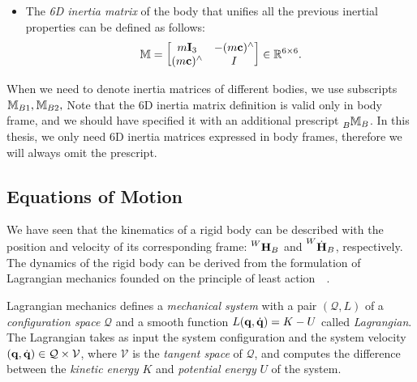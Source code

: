 \begin{itemize}
\item
The \emph{6D inertia matrix} of the body that unifies all the previous inertial properties can be defined as follows:
%
\begin{equation*}
   \masssix =
   \begin{bmatrix}
       m \eye_3 & -(m\mathbf{c})^\wedge \\
       (m\mathbf{c})^\wedge & I
   \end{bmatrix}
   \in \realn^{6\times6}
   .
\end{equation*}

\end{itemize}

\begin{remark*}
    When we need to denote inertia matrices of different bodies, we use subscripts $\masssix_{B1}, \masssix_{B2},$ \etc
    Note that the 6D inertia matrix definition is valid only in body frame, and we should have specified it with an additional prescript $\masssix[B]_B$.
    In this thesis, we only need 6D inertia matrices expressed in body frames, therefore we will always omit the prescript.
\end{remark*}

\subsection{Equations of Motion}
\label{sec:eom_rigid_body}

We have seen that the kinematics of a rigid body can be described with the position and velocity of its corresponding frame: $\homo[W]_B$ and $\homod[W]_B$, respectively.
The dynamics of the rigid body can be derived from the formulation of Lagrangian mechanics founded on the principle of least action~~\parencite{bullo_geometric_2004, selig_geometric_2005, marsden_jerrold_e_introduction_2013, maruskin_dynamical_2018}.

\begin{definition*}
%
Lagrangian mechanics defines a \emph{mechanical system} with a pair $(\mathcal{Q}, L)$ of a \emph{configuration space} $\mathcal{Q}$ and a smooth function $L(\Qu, \Qud) = K - U$ called \emph{Lagrangian}.
The Lagrangian takes as input the system configuration and the system velocity $(\Qu, \Qud) \in \mathcal{Q} \times \mathcal{V}$,
where $\mathcal{V}$ is the \emph{tangent space} of $\mathcal{Q}$, and computes the difference between the \emph{kinetic energy} $K$ and \emph{potential energy} $U$ of the system.
%
\end{definition*}

